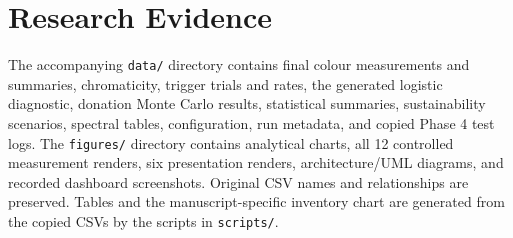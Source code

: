 \documentclass[journal]{IEEEtran}
\begin{document}
\section{Research Evidence}
The accompanying \texttt{data/} directory contains final colour measurements and summaries, chromaticity, trigger trials and rates, the generated logistic diagnostic, donation Monte Carlo results, statistical summaries, sustainability scenarios, spectral tables, configuration, run metadata, and copied Phase 4 test logs. The \texttt{figures/} directory contains analytical charts, all 12 controlled measurement renders, six presentation renders, architecture/UML diagrams, and recorded dashboard screenshots. Original CSV names and relationships are preserved. Tables and the manuscript-specific inventory chart are generated from the copied CSVs by the scripts in \texttt{scripts/}.

\clearpage


\balance
\end{document}
